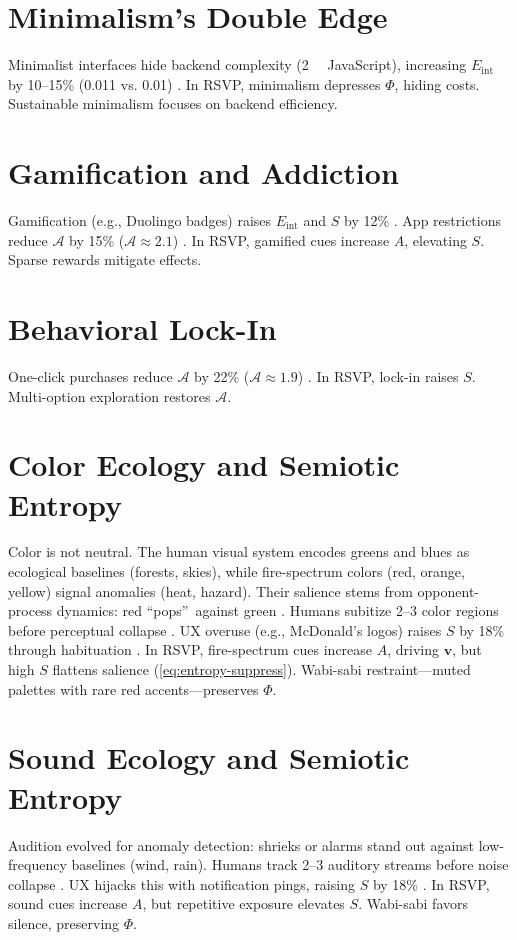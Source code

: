 \documentclass[openany]{book}
\newcommand{\PhiS}{\Phi} %
\newcommand{\vvec}{\mathbf{v}} %
\newcommand{\Sent}{S} %
\newcommand{\Eint}{E_{\mathrm{int}}} %
\newcommand{\Auton}{\mathcal{A}} %
\newcommand{\kWh}{\mathrm{kWh}}
\begin{document}
\section{Minimalism’s Double Edge}
\label{sec:aesthetic-minimalism}
Minimalist interfaces hide backend complexity (\SI{2}{\mega\byte} JavaScript), increasing \(\Eint\) by 10--15\% (\SI{0.011}{\kWh} vs. \SI{0.01}{\kWh}) \citep{designlab2024,extentia2024}. In RSVP, minimalism depresses \(\PhiS\), hiding costs. Sustainable minimalism focuses on backend efficiency.

\section{Gamification and Addiction}
\label{sec:aesthetic-gamification}
Gamification (e.g., Duolingo badges) raises \(\Eint\) and \(\Sent\) by 12\% \citep{colak2024}. App restrictions reduce \(\Auton\) by 15\% (\(\Auton \approx 2.1\)) \citep{doctorow2022}. In RSVP, gamified cues increase \(A\), elevating \(\Sent\). Sparse rewards mitigate effects.

\section{Behavioral Lock-In}
\label{sec:aesthetic-lockin}
One-click purchases reduce \(\Auton\) by 22\% (\(\Auton \approx 1.9\)) \citep{doctorow2022}. In RSVP, lock-in raises \(\Sent\). Multi-option exploration restores \(\Auton\).

\section{Color Ecology and Semiotic Entropy}
\label{sec:color-ecology}
Color is not neutral. The human visual system encodes greens and blues as ecological baselines (forests, skies), while fire-spectrum colors (red, orange, yellow) signal anomalies (heat, hazard). Their salience stems from opponent-process dynamics: red \textquotedblleft pops\textquotedblright\ against green \citep{hurvich1981}. Humans subitize 2--3 color regions before perceptual collapse \citep{kaufman1949}. UX overuse (e.g., McDonald’s logos) raises \(\Sent\) by 18\% through habituation \citep{colak2024}. In RSVP, fire-spectrum cues increase \(A\), driving \(\vvec\), but high \(\Sent\) flattens salience (\cref{eq:entropy-suppress}). Wabi-sabi restraint---muted palettes with rare red accents---preserves \(\PhiS\).

\section{Sound Ecology and Semiotic Entropy}
\label{sec:sound-ecology}
Audition evolved for anomaly detection: shrieks or alarms stand out against low-frequency baselines (wind, rain). Humans track 2--3 auditory streams before noise collapse \citep{bregman1990}. UX hijacks this with notification pings, raising \(\Sent\) by 18\% \citep{colak2024}. In RSVP, sound cues increase \(A\), but repetitive exposure elevates \(\Sent\). Wabi-sabi favors silence, preserving \(\PhiS\).
\end{document}
